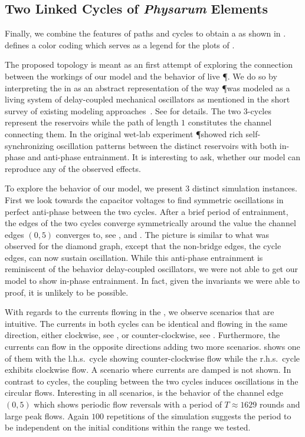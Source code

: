 	\subsection{Two Linked Cycles of \emph{Physarum} Elements}

		Finally, we combine the features of paths and cycles to obtain a \Pn as shown in .  defines a color coding which serves as a legend for the plots of .

		The proposed topology is meant as an first attempt of exploring the connection between the workings of our model and the behavior of live \P. We do so by interpreting the \Pn in  as an abstract representation of the way \P was modeled as a living system of delay-coupled mechanical oscillators as mentioned in the short survey of existing modeling approaches~\cite{PhysRevLett.85.2026}. See  for details. The two $3$-cycles represent the reservoirs while the path of length $1$ constitutes the channel connecting them. In the original wet-lab experiment \P showed rich self-synchronizing oscillation patterns between the distinct reservoirs with both in-phase and anti-phase entrainment. It is interesting to ask, whether our model can reproduce any of the observed effects.

		To explore the behavior of our model, we present $3$ distinct simulation instances. First we look towards the capacitor voltages to find symmetric oscillations in perfect anti-phase between the two cycles. After a brief period of entrainment, the edges of the two cycles converge symmetrically around the value the channel edges $(0,5)$ converges to, see ,  and . The picture is similar to what was observed for the diamond graph, except that the non-bridge edges, \ie the cycle edges, can now sustain oscillation. While this anti-phase entrainment is reminiscent of the behavior delay-coupled oscillators, we were not able to get our model to show in-phase entrainment. In fact, given the invariants we were able to proof, it is unlikely to be possible.

		With regards to the currents flowing in the \Pn, we observe scenarios that are intuitive. The currents in both cycles can be identical and flowing in the same direction, either clockwise, see , or counter-clockwise, see . Furthermore, the currents can flow in the opposite directions adding two more scenarios.  shows one of them with the l.h.s.\ cycle showing counter-clockwise flow while the r.h.s.\ cycle exhibits clockwise flow. A scenario where currents are damped is not shown. In contrast to cycles, the coupling between the two cycles induces oscillations in the circular flows. Interesting in all scenarios, is the behavior of the channel edge $(0,5)$ which shows periodic flow reversals with a period of $T \approx 1629 $ rounds and large peak flows. Again $100$ repetitions of the simulation suggests the period to be independent on the initial conditions within the range we tested.


